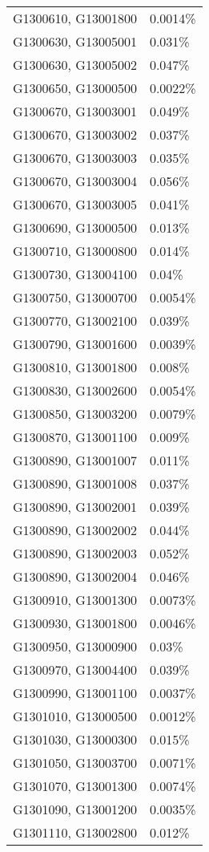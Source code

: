 \begin{longtable}[]{@{}ll@{}}
G1300610, G13001800 & 0.0014\% \\
G1300630, G13005001 & 0.031\% \\
G1300630, G13005002 & 0.047\% \\
G1300650, G13000500 & 0.0022\% \\
G1300670, G13003001 & 0.049\% \\
G1300670, G13003002 & 0.037\% \\
G1300670, G13003003 & 0.035\% \\
G1300670, G13003004 & 0.056\% \\
G1300670, G13003005 & 0.041\% \\
G1300690, G13000500 & 0.013\% \\
G1300710, G13000800 & 0.014\% \\
G1300730, G13004100 & 0.04\% \\
G1300750, G13000700 & 0.0054\% \\
G1300770, G13002100 & 0.039\% \\
G1300790, G13001600 & 0.0039\% \\
G1300810, G13001800 & 0.008\% \\
G1300830, G13002600 & 0.0054\% \\
G1300850, G13003200 & 0.0079\% \\
G1300870, G13001100 & 0.009\% \\
G1300890, G13001007 & 0.011\% \\
G1300890, G13001008 & 0.037\% \\
G1300890, G13002001 & 0.039\% \\
G1300890, G13002002 & 0.044\% \\
G1300890, G13002003 & 0.052\% \\
G1300890, G13002004 & 0.046\% \\
G1300910, G13001300 & 0.0073\% \\
G1300930, G13001800 & 0.0046\% \\
G1300950, G13000900 & 0.03\% \\
G1300970, G13004400 & 0.039\% \\
G1300990, G13001100 & 0.0037\% \\
G1301010, G13000500 & 0.0012\% \\
G1301030, G13000300 & 0.015\% \\
G1301050, G13003700 & 0.0071\% \\
G1301070, G13001300 & 0.0074\% \\
G1301090, G13001200 & 0.0035\% \\
G1301110, G13002800 & 0.012\% \\

\end{longtable}
